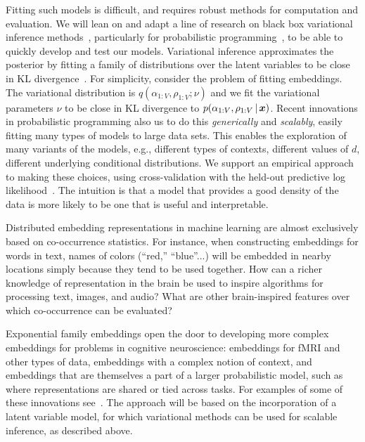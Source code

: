 Fitting such models is
difficult, and requires robust methods for computation and
evaluation.  We will lean on and adapt a line of research on black
box variational inference methods~\citep{Ranganath:2014}, particularly
for probabilistic programming~\citep{Kucukelbir:2017,Tran:2017}, to be
able to quickly develop and test our models.
Variational inference approximates the posterior by fitting a family
of distributions over the latent variables to be close in KL
divergence~\citep{Jordan:1999,Blei:2017}.  For simplicity, consider
the problem of fitting embeddings.  The variational
distribution is $q(\alpha_{1:V}, \rho_{1:V} ; \nu)$ and we fit the
variational parameters $\nu$ to be close in KL divergence to
$p(\alpha_{1:V}, \rho_{1:V} \,\vert\, \boldsymbol{x})$.  Recent innovations in
probabilistic programming also us to do this \textit{generically} and
\textit{scalably}, easily fitting many types of models to large
data sets.  This enables the exploration of many variants of the
models, e.g., different types of contexts, different values of $d$,
different underlying conditional distributions.
We support an empirical approach to making these
choices, using cross-validation with the held-out predictive log
likelihood~\citep{Wallach:2009a}.  The
intuition is that a model that provides a good density of the data
is more likely to be one that is useful and interpretable.


Distributed embedding representations in machine learning are almost
exclusively based on co-occurrence statistics. For instance, when
constructing embeddings for words in text, names of colors (``red,''
``blue''...) will be embedded in nearby locations simply because they
tend to be used together. How can a richer knowledge of representation
in the brain be used to inspire algorithms for processing text,
images, and audio? What are other brain-inspired features over which
co-occurrence can be evaluated?

Exponential family embeddings open
the door to developing more complex embeddings for
problems in cognitive neuroscience: embeddings for fMRI and other
types of data, embeddings with a complex notion of context, and
embeddings that are themselves a part of a larger probabilistic model,
such as where representations are shared or tied across tasks.  For
examples of some of these innovations see~\citet{Rudolph:2016b}.
The approach will be based on the incorporation of a latent variable model,
for which variational methods can be used for scalable inference, 
as described above.


